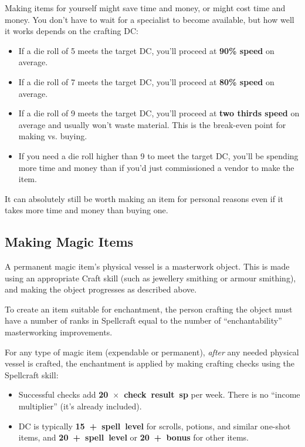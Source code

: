 Making items for yourself might save time and money, or might cost time
and money. You don't have to wait for a specialist to become available, but
how well it works depends on the crafting DC:

\begin{itemize}
\item If a die roll of 5 meets the target DC, you'll proceed at
\textbf{90\% speed} on average.
\item If a die roll of 7 meets the target DC, you'll proceed at
\textbf{80\% speed} on average.
\item If a die roll of 9 meets the target DC, you'll proceed at
\textbf{two thirds speed} on average and usually won't waste material.
This is the break-even point for making vs. buying.
\item If you need a die roll higher than 9 to meet the target DC, you'll
be spending more time and money than if you'd just commissioned a vendor to
make the item.
\end{itemize}

It can absolutely still be worth making an item for personal reasons even
if it takes more time and money than buying one.

%
\subsection{Making Magic Items}

A permanent magic item's physical vessel is a masterwork object. This is
made using an appropriate Craft skill (such as jewellery smithing or
armour smithing), and making the object progresses as described above.

To create an item suitable for enchantment, the person crafting the object
must have a number of ranks in Spellcraft equal to the number of
``enchantability'' masterworking improvements.

For any type of magic item (expendable or permanent), \textit{after} any
needed physical vessel is crafted, the enchantment is applied by making
crafting checks using the Spellcraft skill:

\begin{itemize}
\item Successful checks add \mbox{\bfseries 20 $\times$ check result sp}
per week. There is no ``income multiplier'' (it's already included).
\item DC is typically \mbox{\bfseries 15 + spell level} for scrolls,
potions, and similar one-shot items, and \mbox{\bfseries 20 + spell level}
or \mbox{\bfseries 20 + bonus} for other items.
\end{itemize}

